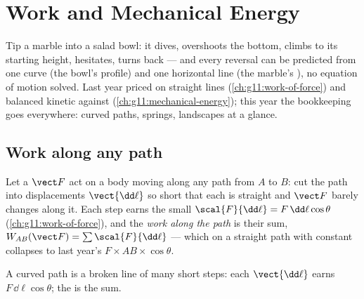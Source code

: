 \chapter{Work and Mechanical Energy}\label{ch:g12:work-and-energy}

Tip a marble into a salad bowl: it dives, overshoots the bottom,
climbs to its starting height, hesitates, turns back --- and every
reversal can be predicted from one curve (the bowl's profile) and one
horizontal line (the marble's ), no equation of motion solved.
Last year priced  on straight lines (\cref{ch:g11:work-of-force})
and balanced kinetic against 
(\cref{ch:g11:mechanical-energy}); this year the bookkeeping goes
everywhere: curved paths, springs, landscapes at a glance.

\section{Work along any path}

\begin{definition}\label{def:g12:work-and-energy:path}
Let a  $\vect F$ act on a body moving along any path from $A$ to
$B$: cut the path into displacements $\vect{\dd\ell}$ so short that
each is straight and $\vect F$ barely changes along it. Each step earns
the small  $\scal{F}{\dd\ell} = F\,\dd\ell\cos\theta$
(\cref{ch:g11:work-of-force}), and the
\emph{work along the path} is
their sum, $W_{AB}(\vect F) = \sum \scal{F}{\dd\ell}$ --- which on a
straight path with constant  collapses to last year's
$F \times AB \times \cos\theta$.
\end{definition}

\begin{omfigure}

{\small A curved path is a broken line of many short steps: each
$\vect{\dd\ell}$ earns $F\,\dd\ell\cos\theta$; the  is the sum.}
\end{omfigure}

